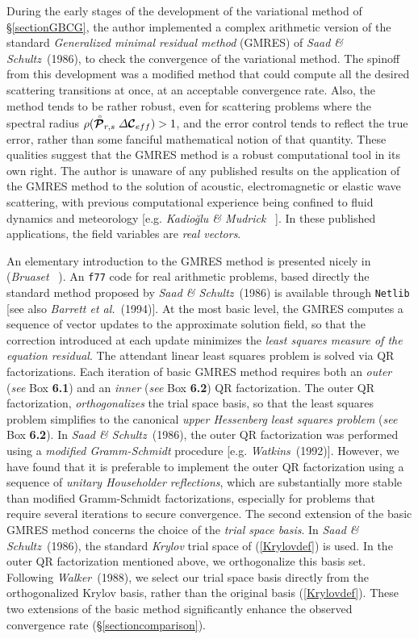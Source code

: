 During the early stages of 
the development of the variational method  of \S\ref{sectionGBCG}, 
the author implemented a complex arithmetic version of the standard {\em 
Generalized minimal 
residual method\/} (GMRES) of {\em Saad \& Schultz}~(1986), to check the 
convergence of the variational method. The spinoff
from this development was a modified method that could compute all the 
desired scattering transitions at once, at an acceptable convergence rate.
Also, the method tends to be rather robust, even for  
scattering problems where the spectral radius $\rho(\stackrel{\scriptscriptstyle _{\,\,\circ}}{ \mbox{\boldmath$\cal P$\unboldmath}}_{r,s}{\mit 
\Delta}{\mbox{\boldmath$\cal C$\unboldmath}}_{eff})> 1$, 
and the error control tends to reflect the true 
error, rather than some fanciful mathematical notion of that quantity. 
These 
qualities suggest that the GMRES method is a robust computational 
tool in its own right. The author is unaware of any published results on 
the application of the 
GMRES method to the solution of acoustic, electromagnetic or elastic wave 
scattering, with previous computational experience being confined to 
fluid dynamics and meteorology [e.g. {\em Kadio\u{g}lu \& Mudrick \/} 
~]. In these published applications,  
the field variables are {\em real vectors\/}.

An elementary introduction to the  GMRES method is presented nicely  in 
({\em Bruaset\/}~ ). An {\tt f77}  code for  real 
arithmetic 
problems, based directly the standard method proposed by {\em Saad \& 
Schultz}~(1986)
is available through {\tt Netlib}  [see also {\em Barrett et 
al.\/}~(1994)]. 
At the most basic level, the GMRES computes a sequence of vector updates 
to the approximate solution field, so that the correction introduced at 
each update minimizes the {\em least squares measure of the equation 
residual\/}. The attendant linear least squares problem is solved via QR 
factorizations. Each iteration of  basic GMRES method 
requires both an {\em outer\/} ({\em see\/} {\sc Box} {\bf 6.1}) and an 
{\em inner\/} ({\em see\/} {\sc Box} {\bf 6.2})  QR factorization. 
The outer QR factorization, {\em orthogonalizes\/} the trial space basis, 
so that the least squares problem simplifies to the canonical {\em upper 
Hessenberg least squares problem\/} ({\em see\/} {\sc Box} {\bf 6.2}). 
In {\em Saad \& Schultz}~(1986), the outer QR factorization was performed
 using a {\em modified Gramm-Schmidt \/} procedure [e.g. {\em 
Watkins}~(1992)]. 
 However, we have 
found that it is preferable to implement the outer QR factorization using 
a 
sequence of {\em unitary Householder reflections}, which are 
substantially more stable than modified Gramm-Schmidt factorizations,
especially for problems that require several iterations to secure 
convergence.
The second extension of the basic GMRES method concerns the choice of the 
{\em trial space basis\/}. In {\em Saad \& Schultz}~(1986), the standard 
{\em 
Krylov} trial space of (\ref{Krylovdef}) is used. In the outer QR 
factorization mentioned above, we  orthogonalize this basis set.
Following {\em Walker\/}~(1988), we select our trial space basis directly 
from the orthogonalized Krylov basis, rather than the original basis 
(\ref{Krylovdef}).  These two extensions of the basic method significantly
 enhance the observed convergence rate 
(\S\ref{sectioncomparison}).

